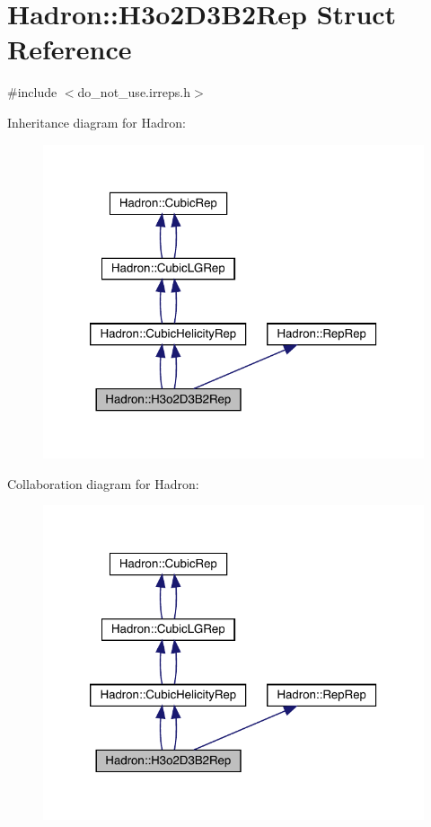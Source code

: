 \hypertarget{structHadron_1_1H3o2D3B2Rep}{}\section{Hadron\+:\+:H3o2\+D3\+B2\+Rep Struct Reference}
\label{structHadron_1_1H3o2D3B2Rep}


{\ttfamily \#include $<$do\+\_\+not\+\_\+use.\+irreps.\+h$>$}



Inheritance diagram for Hadron\+:\nopagebreak
\begin{figure}[H]
\begin{center}
\leavevmode
\includegraphics[width=320pt]{d7/d36/structHadron_1_1H3o2D3B2Rep__inherit__graph}
\end{center}
\end{figure}


Collaboration diagram for Hadron\+:\nopagebreak
\begin{figure}[H]
\begin{center}
\leavevmode
\includegraphics[width=320pt]{d3/d40/structHadron_1_1H3o2D3B2Rep__coll__graph}
\end{center}
\end{figure}

